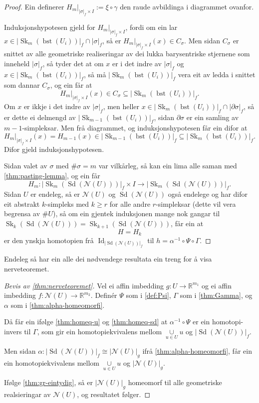 \documentclass[a4paper, 12pt, norsk]{article}
\theoremstyle{plain}
\theoremstyle{definition}
\newcommand{\Rb}{\mathbb{R}}
\newcommand{\Nc}{\mathcal{N}}
\newcommand{\intersect}{ \mathop{\cap}\limits }
\newcommand{\union}{ \mathop{\cup}\limits }
\newcommand{\gr}[1]{ \lvert #1 \rvert } %
\DeclareMathOperator{\Sd}{Sd} %
\DeclareMathOperator{\bst}{bst} %
\DeclareMathOperator{\Sk}{Sk} %
\DeclareMathOperator{\Id}{Id} %
\begin{document}
\begin{proof}
	Ein definerer \( H_m|_{\gr{\sigma}_f \times I} := \xi \circ \gamma \) den raude avbildinga i diagrammet ovanfor.

	Induksjonshypotesen gjeld for \( H_m|_{\gr{\sigma}_f \times I} \), fordi om ein lar \( x \in \gr{\Sk_m(\bst(U_i))}_f \intersect \gr{\sigma}_f \), så er \( H_m|_{\gr{\sigma}_f \times I}(x) \in C_\sigma \). Men sidan \( C_\sigma \) er snittet av alle geometriske realiseringar av dei lukka barysentriske stjernene som inneheld \( \gr{\sigma}_f \), så tyder det at om \( x \) er i det indre av \( \gr{\sigma}_f \) og \( x \in \gr{\Sk_m(\bst(U_i))}_f \), så må \( \gr{\Sk_m(\bst(U_i))}_f \) vera eit av ledda i snittet som dannar \( C_\sigma \), og ein får at
	\[
		H_m|_{\gr{\sigma}_f \times I}(x) \in C_\sigma \subseteq \gr{\Sk_m(\bst(U_i))}_f.
	\]
	Om \( x \) er ikkje i det indre av \( \gr{\sigma}_f \), men heller \( x \in \gr{\Sk_m(\bst(U_i))}_f \intersect \gr{\partial\sigma}_f \), så er dette ei delmengd av \( \gr{\Sk_{m-1}(\bst(U_i))}_f \), sidan \( \partial\sigma \) er ein samling av \( m-1 \)-simpleksar. Men frå diagrammet, og induksjonshypotesen får ein difor at
	\[
		H_m|_{\gr{\sigma}_f \times I}(x) = H_{m-1}(x) \in \gr{\Sk_{m-1}(\bst(U_i))}_f \subseteq \gr{\Sk_{m}(\bst(U_i))}_f.
	\]
	Difor gjeld induksjonshypotesen.

	Sidan valet av \( \sigma \) med \( \#\sigma = m \) var vilkårleg, så kan ein lima alle saman med \autoref{thm:pasting-lemma}, og ein får
	\[
		H_m : \gr{\Sk_m(\Sd(\Nc(U)))}_f \times I \to \gr{\Sk_m(\Sd(\Nc(U)))}_f.
	\]
	Sidan \( U \) er endeleg, så er \( \Nc(U) \) og \( \Sd(\Nc(U)) \) også endelege og har difor eit abstrakt \( k \)-simpleks med \( k \geq r \) for alle andre \( r \)-simpleksar (dette vil vera begrensa av \( \#U \)), så om ein gjentek induksjonen mange nok gangar til \( \Sk_{k}(\Sd(\Nc(U))) = \Sk_{k+1}(\Sd(\Nc(U))) \), får ein at
	\[
		H = H_k
	\]
	er den ynskja homotopien frå \( \Id_{\gr{\Sd(\Nc(U))}_f} \) til \( h = \alpha^{-1} \circ \Psi \circ \Gamma \).
\end{proof}

Endeleg så har ein alle dei nødvendege resultata ein treng for å visa nerveteoremet.

\begin{proof}[Bevis av \autoref{thm:nerveteoremet}]
	Vel ei affin imbedding \( g: U \to \Rb^{m_1} \) og ei affin imbedding \( f: \Nc(U) \to \Rb^{m_2} \). Definér \( \Psi \) som i \autoref{def:Psi}, \( \Gamma \) som i \autoref{thm:Gamma}, og \( \alpha \) som i \autoref{thm:alpha-homeomorfi}.

	Då får ein ifølge \autoref{thm:homeq-u} og \autoref{thm:homeq-sd} at \( \alpha^{-1} \circ \Psi \) er ein homotopi-invers til \( \Gamma \), som gir ein homotopiekvivalens mellom \( \union_{u \in U} u \) og \( \gr{\Sd(\Nc(U))}_f \).

	Men sidan \( \alpha : \gr{\Sd(\Nc(U))}_f \cong \gr{\Nc(U)}_g \) ifrå \autoref{thm:alpha-homeomorfi}, får ein ein homotopiekvivalens mellom \( \union_{u \in U} u \) og \( \gr{\Nc(U)}_g \).

	Ifølge \autoref{thm:gr-eintydig}, så er \( \gr{\Nc(U)}_g \) homeomorf til alle geometriske realsieringar av \( \Nc(U) \), og resultatet følger.
\end{proof}
\end{document}
